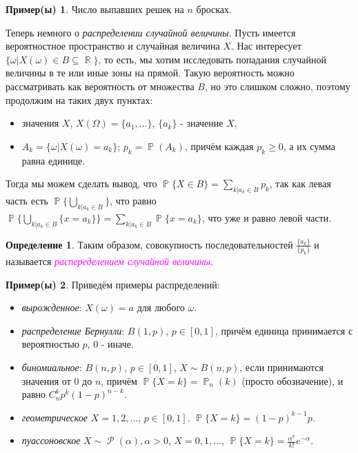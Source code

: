 \documentclass[a4paper,100pt]{article}
\theoremstyle{indented}
\theoremstyle{definition}
\newtheorem{defn}{Определение}
\newtheorem{exl}{Пример(ы)}
\theoremstyle{remark}
\DeclareMathOperator{\RR}{\mathbb{R}}
\DeclareMathOperator{\PP}{\mathbb{P}}
\DeclareMathOperator{\Rho}{\mathcal{P}}
\begin{document}
\begin{exl}
  Число выпавших решек на $n$ бросках.
\end{exl}

Теперь немного о \textit{распределении случайной величины}. Пусть имеется вероятностное пространство и случайная величина $X$. Нас интересует $\{\omega\vert X(\omega)\in B\subseteq \RR \}$, то есть, мы хотим исследовать попадания случайной величины в те или иные зоны на прямой. Такую вероятность можно рассматривать как вероятность от множества $B$, но это слишком сложно, поэтому продолжим на таких двух пунктах:

\begin{itemize}
  \item значения $X$, $X(\Omega)=\{a_1, \ldots\}$, $\{a_k\}$ - значение $X$, 
  \item $A_k=\{\omega\vert X(\omega)=a_k\}$; $p_k=\PP(A_k)$, причём каждая $p_k\geq0$, а их сумма равна единице.
\end{itemize}

Тогда мы можем сделать вывод, что $\PP\{X\in B\}=\sum_{k\vert a_k\in B}p_k$, так как левая часть есть $\PP\{\bigcup_{k\vert a_k\in B}\}$, что равно $\PP\{\bigcup_{k\vert a_k\in B}\{x=a_k\}\}=\sum_{k\vert a_k\in B}\PP\{x=a_k\}$, что уже и равно левой части.\

\begin{defn}
  Таким образом, совокупность последовательностей $\frac{\{a_k\}}{\{p_k\}}$ и называется \hypertarget{n9}{\textcolor{magenta}{\textit{распеределением случайной величины}}}. 
\end{defn}

\begin{exl}
  Приведём примеры распределений:

  \begin{itemize}
      \item \textit{вырожденное}: $X(\omega)=a$ для любого $\omega$.
      \item \textit{распределение Бернулли}: $B(1, p)$, $p\in[0,1]$, причём единица принимается с вероятностью $p$, $0$ - иначе.
      \item \textit{биномиальное}: $B(n, p)$, $p\in[0,1]$, $X\sim B(n, p)$, если принимаются значения от $0$ до $n$, причём $\PP\{X=k\}=\PP_n(k)$ (просто обозначение), и равно $C_n^kp^k(1-p)^{n-k}$.
      \item \textit{геометрическое} $X = 1, 2, \ldots$, $p\in[0,1]$. $\PP\{X=k\}=(1-p)^{k-1}p$.
      \item \textit{пуассоновское} $X\sim \Rho(\alpha), \alpha>0$, $X=0, 1, \ldots$, $\PP\{X=k\}=\frac{\alpha^k}{k!}e^{-\alpha}$. 
  \end{itemize}
\end{exl}
\end{document}
